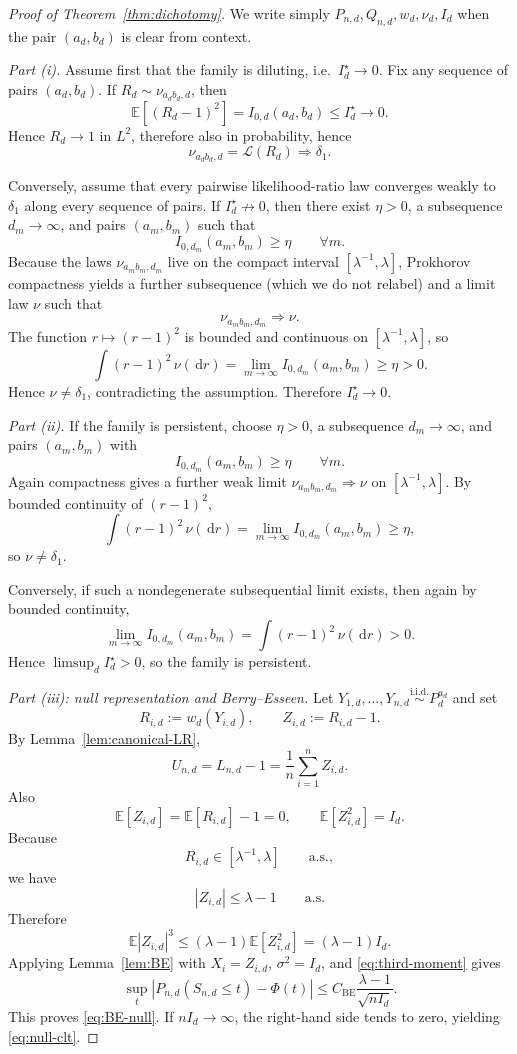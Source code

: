 \documentclass[11pt]{amsart}
\numberwithin{equation}{section}
\theoremstyle{definition}
\newcommand{\E}{\mathbb E}
\newcommand{\dd}{\,\mathrm d}
\newcommand{\iid}{\stackrel{\mathrm{i.i.d.}}{\sim}}
\newcommand{\law}{\mathcal L}
\begin{document}
\begin{proof}[Proof of Theorem~\ref{thm:dichotomy}]
We write simply $P_{n,d},Q_{n,d},w_d,\nu_d,I_d$ when the pair $(a_d,b_d)$ is clear from context.

\smallskip
\noindent\emph{Part (i).}
Assume first that the family is diluting, i.e.\ $I_d^\star\to0$.
Fix any sequence of pairs $(a_d,b_d)$.
If $R_d\sim \nu_{a_db_d,d}$, then
\[
\E[(R_d-1)^2]=I_{0,d}(a_d,b_d)\le I_d^\star \to 0.
\]
Hence $R_d\to 1$ in $L^2$, therefore also in probability, hence
\[
\nu_{a_db_d,d}=\law(R_d)\Rightarrow \delta_1.
\]

Conversely, assume that every pairwise likelihood-ratio law converges weakly to $\delta_1$ along every
sequence of pairs.  If $I_d^\star \not\to 0$, then there exist $\eta>0$, a subsequence $d_m\to\infty$, and
pairs $(a_m,b_m)$ such that
\[
I_{0,d_m}(a_m,b_m)\ge \eta \qquad \forall m.
\]
Because the laws $\nu_{a_m b_m,d_m}$ live on the compact interval
$[\lambda^{-1},\lambda]$, Prokhorov compactness yields a further subsequence
(which we do not relabel) and a limit law $\nu$ such that
\[
\nu_{a_m b_m,d_m}\Rightarrow \nu.
\]
The function $r\mapsto (r-1)^2$ is bounded and continuous on $[\lambda^{-1},\lambda]$, so
\[
\int (r-1)^2\,\nu(\dd r)
=
\lim_{m\to\infty} I_{0,d_m}(a_m,b_m)
\ge \eta >0.
\]
Hence $\nu\neq \delta_1$, contradicting the assumption.  Therefore $I_d^\star\to0$.

\smallskip
\noindent\emph{Part (ii).}
If the family is persistent, choose $\eta>0$, a subsequence $d_m\to\infty$, and pairs $(a_m,b_m)$ with
\[
I_{0,d_m}(a_m,b_m)\ge \eta \qquad \forall m.
\]
Again compactness gives a further weak limit
\(
\nu_{a_m b_m,d_m}\Rightarrow \nu
\)
on $[\lambda^{-1},\lambda]$.
By bounded continuity of $(r-1)^2$,
\[
\int (r-1)^2\,\nu(\dd r)
=
\lim_{m\to\infty} I_{0,d_m}(a_m,b_m)
\ge \eta,
\]
so $\nu\neq \delta_1$.

Conversely, if such a nondegenerate subsequential limit exists, then again by bounded continuity,
\[
\lim_{m\to\infty} I_{0,d_m}(a_m,b_m)
=
\int (r-1)^2\,\nu(\dd r)>0.
\]
Hence $\limsup_d I_d^\star>0$, so the family is persistent.

\smallskip
\noindent\emph{Part (iii): null representation and Berry--Esseen.}
Let $Y_{1,d},\dots,Y_{n,d}\iid P_d^{a_d}$ and set
\[
R_{i,d}:=w_d(Y_{i,d}),
\qquad
Z_{i,d}:=R_{i,d}-1.
\]
By Lemma~\ref{lem:canonical-LR},
\[
U_{n,d}=L_{n,d}-1=\frac1n\sum_{i=1}^n Z_{i,d}.
\]
Also
\[
\E[Z_{i,d}]=\E[R_{i,d}]-1=0,
\qquad
\E[Z_{i,d}^2]=I_d.
\]
Because
\[
R_{i,d}\in [\lambda^{-1},\lambda] \qquad \text{a.s.},
\]
we have
\[
|Z_{i,d}|\le \lambda-1 \qquad\text{a.s.}
\]
Therefore
\[
\E|Z_{i,d}|^3 \le (\lambda-1)\E[Z_{i,d}^2]=(\lambda-1)I_d. \tag{6.12}\label{eq:third-moment}
\]
Applying Lemma~\ref{lem:BE} with
\(
X_i=Z_{i,d}
\),
\(
\sigma^2=I_d
\),
and \eqref{eq:third-moment} gives
\[
\sup_t \left|
P_{n,d}(S_{n,d}\le t)-\Phi(t)
\right|
\le
C_{\mathrm{BE}}\frac{\lambda-1}{\sqrt{nI_d}}.
\]
This proves \eqref{eq:BE-null}.  If \(nI_d\to\infty\), the right-hand side tends to zero, yielding
\eqref{eq:null-clt}.


\end{proof}
\end{document}
